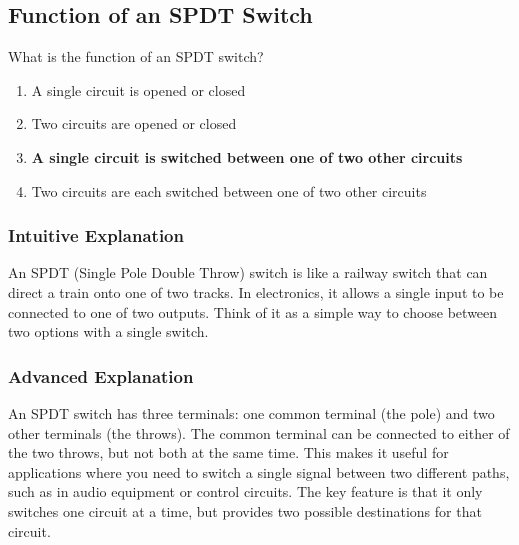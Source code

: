 \subsection{Function of an SPDT Switch}
\label{T6A08}

\begin{tcolorbox}[colback=gray!10!white,colframe=black!75!black,title=T6A08]
What is the function of an SPDT switch?
\begin{enumerate}[noitemsep]
    \item A single circuit is opened or closed
    \item Two circuits are opened or closed
    \item \textbf{A single circuit is switched between one of two other circuits}
    \item Two circuits are each switched between one of two other circuits
\end{enumerate}
\end{tcolorbox}

\subsubsection*{Intuitive Explanation}
An SPDT (Single Pole Double Throw) switch is like a railway switch that can direct a train onto one of two tracks. In electronics, it allows a single input to be connected to one of two outputs. Think of it as a simple way to choose between two options with a single switch.

\subsubsection*{Advanced Explanation}
An SPDT switch has three terminals: one common terminal (the pole) and two other terminals (the throws). The common terminal can be connected to either of the two throws, but not both at the same time. This makes it useful for applications where you need to switch a single signal between two different paths, such as in audio equipment or control circuits. The key feature is that it only switches one circuit at a time, but provides two possible destinations for that circuit.